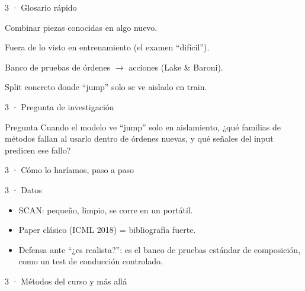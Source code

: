 \begin{frame}{3 · Glosario rápido}
  \begin{description}[font=\bfseries\scriptsize,style=nextline,leftmargin=1.5cm]
    \item[Composición] Combinar piezas conocidas en algo nuevo.
    \item[OOD] Fuera de lo visto en entrenamiento (el examen ``difícil'').
    \item[SCAN] Banco de pruebas de órdenes $\rightarrow$ acciones (Lake \& Baroni).
    \item[addprim\_jump] Split concreto donde ``jump'' solo se ve aislado en train.
  \end{description}
\end{frame}

\begin{frame}{3 · Pregunta de investigación}
  \begin{block}{Pregunta}
    Cuando el modelo ve ``jump'' solo en aislamiento, ¿qué familias de métodos fallan al usarlo dentro de órdenes nuevas, y qué señales del input predicen ese fallo?
  \end{block}
\end{frame}

\begin{frame}{3 · Cómo lo haríamos, paso a paso}
\end{frame}

\begin{frame}{3 · Datos}
  \begin{itemize}
    \item SCAN: pequeño, limpio, se corre en un portátil.
    \item Paper clásico (ICML 2018) = bibliografía fuerte.
    \item Defensa ante ``¿es realista?'': es el banco de pruebas estándar de composición, como un test de conducción controlado.
  \end{itemize}
\end{frame}

\begin{frame}{3 · Métodos del curso y más allá}
\end{frame}

